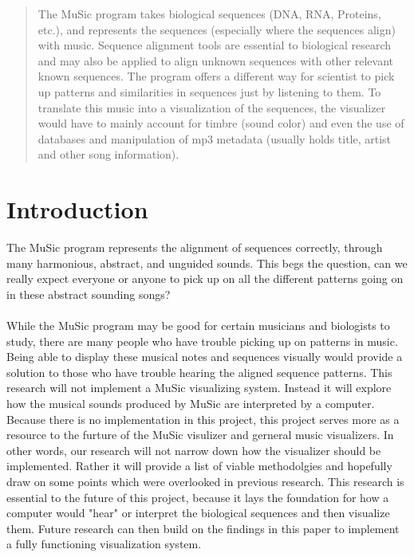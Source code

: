 \documentclass[11pt]{article}
\begin{document}

\begin{quote}
The MuSic program takes biological sequences (DNA, RNA, Proteins, etc.), and represents the sequences (especially where the sequences align) with music. Sequence alignment tools are essential to biological research and may also be applied to align unknown sequences with other relevant known sequences. The program offers a different way for scientist to pick up patterns and similarities in sequences just by listening to them. To translate this music into a visualization of the sequences, the visualizer would have to mainly account for timbre (sound color) and even the use of databases and manipulation of mp3 metadata (usually holds title, artist and other song information).
\end{quote}

\section{Introduction}
\label{sec:introduction}
\vspace*{-.1in}


The MuSic program represents the alignment of sequences correctly, through many harmonious, abstract, and unguided sounds. This begs the question, can we really expect everyone or anyone to pick up on all the different patterns going on in these abstract sounding songs? \\ \\
While the MuSic program may be good for certain musicians and biologists to study, there are many people who have trouble picking up on patterns in music. Being able to display these musical notes and sequences visually would provide a solution to those who have trouble hearing the aligned sequence patterns. This research will not implement a MuSic visualizing system. Instead it will explore how the musical sounds produced by MuSic are interpreted by a computer. Because there is no implementation in this project, this project serves more as a resource to the furture of the MuSic visulizer and gerneral music visualizers. In other words, our research will not narrow down how the visualizer should be implemented. Rather it will provide a list of viable methodolgies and hopefully draw on some points which were overlooked in previous research. This research is essential to the future of this project, because it lays the foundation for how a computer would "hear" or interpret the biological sequences and then visualize them. Future research can then build on the findings in this paper to implement a fully functioning visualization system. 
\end{document}
